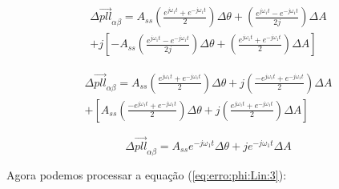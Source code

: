 \documentclass[12pt,a4paper]{report}
\begin{document}
{
\color{blue}

\begin{multline}
\Delta \vec{pll}_{\alpha\beta} =
A_{ss} 
\left(
\frac{e^{j\omega_1 t} + e^{-j\omega_1 t}}{2}
\right)
\Delta \theta +
\left(
\frac{e^{j\omega_1 t} - e^{-j\omega_1 t}}{2j}
\right)
\Delta A \\ 
+ j\left[
- A_{ss} 
\left(
\frac{e^{j\omega_1 t} - e^{-j\omega_1 t}}{2j}
\right) 
\Delta \theta +
\left(
\frac{e^{j\omega_1 t} + e^{-j\omega_1 t}}{2}
\right)
\Delta A
\right]
\end{multline}



\begin{multline}
\Delta \vec{pll}_{\alpha\beta} =
A_{ss} 
\left(
\frac{e^{j\omega_1 t} + e^{-j\omega_1 t}}{2}
\right)
\Delta \theta +
j\left(
\frac{-e^{j\omega_1 t} + e^{-j\omega_1 t}}{2}
\right)
\Delta A \\ 
+ \left[
A_{ss} 
\left(
\frac{-e^{j\omega_1 t} + e^{-j\omega_1 t}}{2}
\right) 
\Delta \theta +
j \left(
\frac{e^{j\omega_1 t} + e^{-j\omega_1 t}}{2}
\right)
\Delta A
\right]
\end{multline}



}

\begin{equation}
\Delta \vec{pll}_{\alpha\beta} =
A_{ss} e^{-j\omega_1 t} \Delta \theta
+j e^{-j\omega_1 t} \Delta A
\end{equation}




Agora podemos processar a equação (\ref{eq:erro:phi:Lin:3}):
\end{document}
